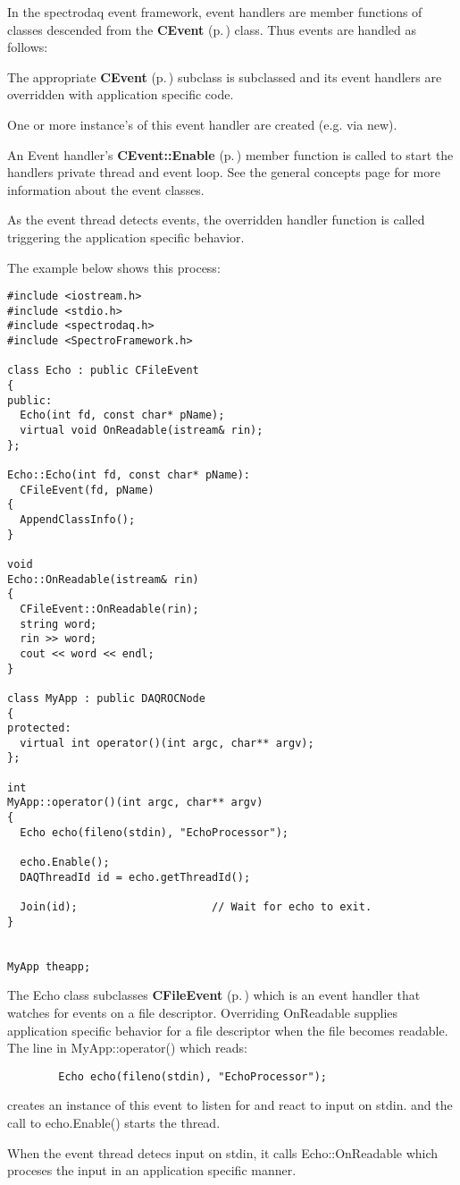 In the spectrodaq event framework, event handlers are member functions of classes descended from the {\bf CEvent} {\rm (p.\,\pageref{classCEvent})} class. Thus events are handled as follows:\begin{CompactItemize}
\item 
The appropriate {\bf CEvent} {\rm (p.\,\pageref{classCEvent})} subclass is subclassed and its event handlers are  overridden with application specific code.\item 
One or more instance's of this event handler are created (e.g. via new).\item 
An Event handler's {\bf CEvent::Enable} {\rm (p.\,\pageref{classCEvent_a11})} member function is called to start the handlers private thread and event loop. See the general   concepts page for more information about the event classes.\item 
As the event thread detects events, the overridden handler function is  called triggering the application specific behavior.\end{CompactItemize}
The example below shows this process: 

\footnotesize\begin{verbatim}#include <iostream.h>
#include <stdio.h>
#include <spectrodaq.h>
#include <SpectroFramework.h>

class Echo : public CFileEvent
{
public:
  Echo(int fd, const char* pName);
  virtual void OnReadable(istream& rin);
};

Echo::Echo(int fd, const char* pName):
  CFileEvent(fd, pName)
{
  AppendClassInfo();
}

void
Echo::OnReadable(istream& rin)
{
  CFileEvent::OnReadable(rin);
  string word;
  rin >> word;
  cout << word << endl;
}

class MyApp : public DAQROCNode
{
protected:
  virtual int operator()(int argc, char** argv);
};

int
MyApp::operator()(int argc, char** argv)
{
  Echo echo(fileno(stdin), "EchoProcessor");

  echo.Enable();
  DAQThreadId id = echo.getThreadId();

  Join(id);                     // Wait for echo to exit.
}


MyApp theapp;
\end{verbatim}\normalsize 


The Echo class subclasses {\bf CFile\-Event} {\rm (p.\,\pageref{classCFileEvent})} which is an event handler that watches  for events on a file descriptor. Overriding On\-Readable supplies application specific behavior for a file descriptor when the file becomes readable. The line in My\-App::operator() which reads: 

\footnotesize\begin{verbatim}        Echo echo(fileno(stdin), "EchoProcessor");
\end{verbatim}\normalsize 
 creates an instance of this event to listen for and react to input on stdin. and the call to echo.Enable() starts the thread.

When the event thread detecs input on stdin, it calls Echo::On\-Readable which proceses the input in an application specific manner.

